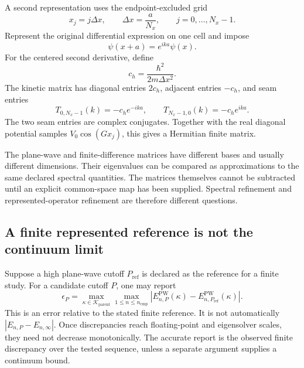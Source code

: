 A second representation uses the endpoint-excluded grid
\begin{equation}
  x_j=j\Delta x,
  \qquad
  \Delta x=\frac{a}{N_x},
  \qquad
  j=0,\ldots,N_x-1.
  \label{eq:training-isolated-real-grid}
\end{equation}
Represent the original differential expression on one cell and impose
\begin{equation}
  \psi(x+a)=e^{ika}\psi(x).
  \label{eq:training-isolated-bloch-boundary}
\end{equation}
For the centered second derivative, define
\begin{equation}
  c_h=\frac{\hbar^2}{2m\Delta x^2}.
\end{equation}
The kinetic matrix has diagonal entries $2c_h$, adjacent entries $-c_h$, and
seam entries
\begin{equation}
  T_{0,N_x-1}(k)=-c_h e^{-ika},
  \qquad
  T_{N_x-1,0}(k)=-c_h e^{ika}.
  \label{eq:training-isolated-fd-seam}
\end{equation}
The two seam entries are complex conjugates. Together with the real diagonal
potential samples $V_0\cos(Gx_j)$, this gives a Hermitian finite matrix.

The plane-wave and finite-difference matrices have different bases and usually
different dimensions. Their eigenvalues can be compared as approximations to
the same declared spectral quantities. The matrices themselves cannot be
subtracted until an explicit common-space map has been supplied. Spectral
refinement and represented-operator refinement are therefore different
questions.

\subsection{A finite represented reference is not the continuum limit}

Suppose a high plane-wave cutoff $P_{\mathrm{ref}}$ is declared as the
reference for a finite study. For a candidate cutoff $P$, one may report
\begin{equation}
  \epsilon_P
  =\max_{\kappa\in\mathcal K_{\mathrm{parent}}}
    \max_{1\leq n\leq n_{\mathrm{cmp}}}
    \left|
      E_{n,P}^{\mathrm{PW}}(\kappa)
      -E_{n,P_{\mathrm{ref}}}^{\mathrm{PW}}(\kappa)
    \right|.
  \label{eq:training-isolated-finite-reference-error}
\end{equation}
This is an error relative to the stated finite reference. It is not automatically
$|E_{n,P}-E_{n,\infty}|$. Once discrepancies reach floating-point and
eigensolver scales, they need not decrease monotonically. The accurate report
is the observed finite discrepancy over the tested sequence, unless a separate
argument supplies a continuum bound.

